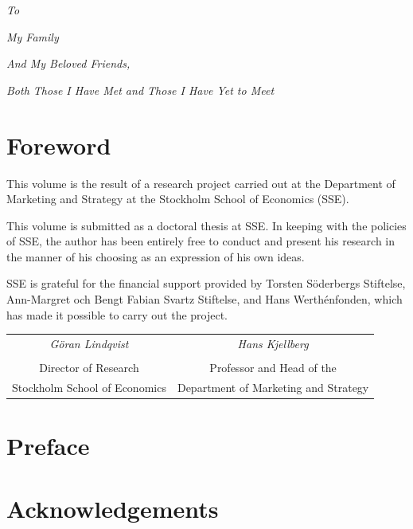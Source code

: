 \documentclass[twoside,11pt,american,openright,final]{memoir}
\begin{document}
\cleardoublepage
\thispagestyle{empty}
\vspace*{45mm}
\begin{center}
\textit{To}

\textit{My Family}

\textit{And My Beloved Friends,}

\textit{Both Those I Have Met and Those I Have Yet to Meet}
\end{center}

\cleardoublepage
\chapter*{Foreword}\thispagestyle{empty}
This volume is the result of a research project carried out at the Department of Marketing and Strategy at the Stockholm School of Economics (SSE).

This volume is submitted as a doctoral thesis at SSE. In keeping with the policies of SSE, the author has been entirely free to conduct and present his research in the manner of his choosing as an expression of his own ideas.

SSE is grateful for the financial support provided by Torsten Söderbergs Stiftelse, Ann-Margret och Bengt Fabian Svartz Stiftelse, and Hans Werthénfonden, which has made it possible to carry out the project.

\vspace{2\onelineskip}

\begin{tabular}{cc}
\emph{Göran Lindqvist} & \emph{Hans Kjellberg}\\
& \\
Director of Research & Professor and Head of the\\
Stockholm School of Economics & Department of Marketing and Strategy\\
\end{tabular}
\cleardoublepage


\chapter*{Preface}

\cleardoublepage

\cleardoublepage
\chapter*{Acknowledgements}
\thispagestyle{empty}
\end{document}
